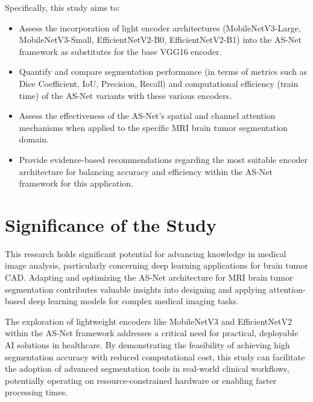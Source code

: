 Specifically, this study aims to:
\begin{itemize}
  \item Assess the incorporation of light encoder architectures (MobileNetV3-Large, MobileNetV3-Small, EfficientNetV2-B0, EfficientNetV2-B1) into the AS-Net framework as substitutes for the base VGG16 encoder.
  \item Quantify and compare segmentation performance (in terms of metrics such as Dice Coefficient, IoU, Precision, Recall) and computational efficiency (train time) of the AS-Net variants with these various encoders.
  \item Assess the effectiveness of the AS-Net's spatial and channel attention mechanisms when applied to the specific MRI brain tumor segmentation domain.
  \item Provide evidence-based recommendations regarding the most suitable encoder architecture for balancing accuracy and efficiency within the AS-Net framework for this application.
\end{itemize}

\section{Significance of the Study}

This research holds significant potential for advancing knowledge in medical image analysis, particularly concerning deep learning applications for brain tumor CAD. Adapting and optimizing the AS-Net architecture \parencite{hu2022asnet} for MRI brain tumor segmentation contributes valuable insights into designing and applying attention-based deep learning models for complex medical imaging tasks.

The exploration of lightweight encoders like MobileNetV3 and EfficientNetV2 within the AS-Net framework addresses a critical need for practical, deployable AI solutions in healthcare. By demonstrating the feasibility of achieving high segmentation accuracy with reduced computational cost, this study can facilitate the adoption of advanced segmentation tools in real-world clinical workflows, potentially operating on resource-constrained hardware or enabling faster processing times.

